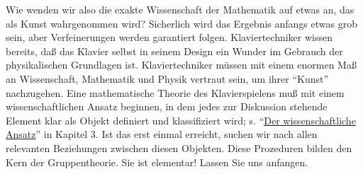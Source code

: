 Wie wenden wir also die exakte Wissenschaft der Mathematik auf etwas an, das als Kunst wahrgenommen wird?
Sicherlich wird das Ergebnis anfangs etwas grob sein, aber Verfeinerungen werden garantiert folgen.
Klaviertechniker wissen bereits, daß das Klavier selbst in seinem Design ein Wunder im Gebrauch der physikalischen Grundlagen ist.
Klaviertechniker müssen mit einem enormen Maß an Wissenschaft, Mathematik und Physik vertraut sein, um ihrer \enquote{Kunst} nachzugehen.
Eine mathematische Theorie des Klavierspielens muß mit einem wissenschaftlichen Ansatz beginnen, in dem jedes zur Diskussion stehende Element klar als Objekt definiert und klassifiziert wird; s. \enquote{\hyperlink{c3_2}{Der wissenschaftliche Ansatz}} in Kapitel 3.
Ist das erst einmal erreicht, suchen wir nach allen relevanten Beziehungen zwischen diesen Objekten.
Diese Prozeduren bilden den Kern der Gruppentheorie. Sie ist elementar! Lassen Sie uns anfangen.



